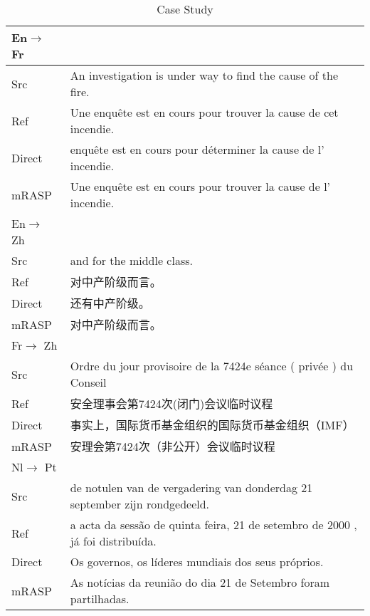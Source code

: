 \documentclass[11pt,a4paper]{article}
\begin{document}
\begin{CJK}{UTF8}{gkai}
\begin{table*}[t]
\begin{center}
\begin{tabular}{ll}
\toprule
En$\rightarrow$ Fr &  \\
\midrule
Src & An investigation is under way to find the cause of the fire. \\
Ref & Une enquête est en cours pour trouver la cause de cet incendie. \\
Direct & enquête est en cours pour déterminer la cause de l' incendie. \\
mRASP & Une enquête est en cours pour trouver la cause de l' incendie. \\

\midrule

En$\rightarrow$ Zh &  \\
\midrule

Src & and for the middle class. \\

Ref & 对中产阶级而言。 \\
Direct & 还有中产阶级。 \\
mRASP & 对中产阶级而言。 \\


\midrule

Fr$\rightarrow$ Zh &  \\
\midrule

Src & Ordre du jour provisoire de la 7424e séance ( privée ) du Conseil \\
Ref & 安全理事会第7424次(闭门)会议临时议程 \\
Direct & 事实上，国际货币基金组织的国际货币基金组织（IMF） \\
mRASP & 安理会第7424次（非公开）会议临时议程 \\

\midrule

Nl$\rightarrow$ Pt &  \\
\midrule
Src & de notulen van de vergadering van donderdag 21 september zijn rondgedeeld. \\
Ref & a acta da sessão de quinta feira, 21 de setembro de 2000 , já foi distribuída. \\
Direct & Os governos, os líderes mundiais dos seus próprios. \\
mRASP & As notícias da reunião do dia 21 de Setembro foram partilhadas. \\

\bottomrule
\end{tabular}
\caption{Case Study}
\label{case-en2fr}
\end{center}
\end{table*}

 \end{CJK}
\end{document}
